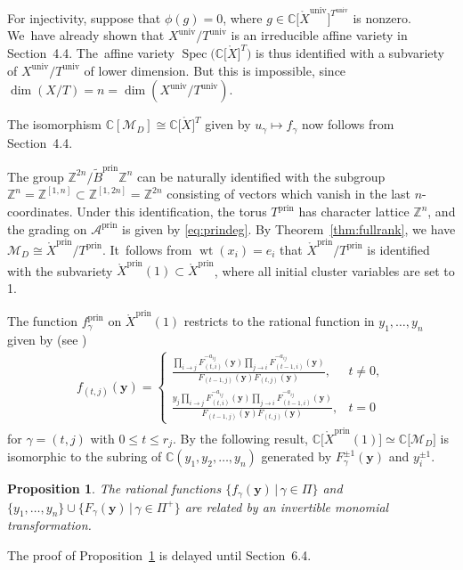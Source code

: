 \documentclass[10pt,a4paper]{amsart}
\def\C{{\mathbb C}}
\def\Z{{\mathbb Z}}
\def\A{{\mathcal{A}}}
\def\Xo{{\mathring{X}}}
\def\Spec{\operatorname{Spec}}
\def\prin{{\operatorname{prin}}}
\def\univ{{\operatorname{univ}}}
\def\tB{{\tilde B}}
\def\wt{\operatorname{wt}}
\def\M{{\mathcal{M}}}
\def\tB{{\tilde B}}
\def\y{{\mathbf y}}
\numberwithin{equation}{section}
\newtheorem{Proposition}[Theorem]{Proposition}
\begin{document}
For injectivity, suppose that $\phi(g) = 0$, where $g \in \C\big[\Xo^\univ\big]^{T^\univ}$ is nonzero. We~have already shown that $X^\univ/T^\univ$ is an irreducible affine variety in Section~4.4. The~affine variety $\Spec\big(\C\big[\Xo\big]^T\big)$ is thus identified with a subvariety of $X^\univ/T^\univ$ of lower dimension. But this is impossible, since $\dim(X/T) =n = \dim(X^\univ/T^\univ)$.

The isomorphism $\C[\M_D] \cong \C\big[\Xo\big]^T$ given by $u_\gamma \mapsto f_\gamma$ now follows from Section~4.4.

\bigskip{}
The group $\Z^{2n}/\tB^\prin \Z^n$ can be naturally identified with the subgroup $\Z^n = \Z^{[1,n]} \subset \Z^{[1,2n]}=\Z^{2n}$ consisting of vectors which vanish in the last $n$-coordinates. Under this identification, the torus $T^\prin$ has character lattice $\Z^n$, and the grading on $\A^\prin$ is given by \eqref{eq:prindeg}. By Theorem~\ref{thm:fullrank}, we have $\M_D \cong \Xo^\prin/T^\prin$. It~follows from $\wt(x_i) = e_i$ that $\Xo^\prin/T^\prin$ is identified with the subvariety $\Xo^\prin(1) \subset \Xo^\prin$, where all initial cluster variables are set to 1.

The function $f^\prin_\gamma$ on $\Xo^\prin(1)$ restricts to the rational function in $y_1,\dots,y_n$ given by (see \cite[Theorem~1.5]{YZ})
\begin{gather} \label{eq:fy}
f_{(t,j)}(\y) = \begin{cases}
\frac{\prod_{i \to j} F_{(t,i)}^{-a_{ij}}(\y) \prod_{j \to i} F_{(t-1,i)}^{-a_{ij}}(\y)}{F_{(t-1,j)}(\y) F_{(t,j)}(\y) }, &t \neq 0,
\\[1.5ex]
 \frac{y_j \prod_{i \to j} F_{(t,i)}^{-a_{ij}}(\y) \prod_{j \to i} F_{(t-1,i)}^{-a_{ij}}(\y)}{F_{(t-1,j)}(\y) F_{(t,j)}(\y) }, &t = 0
 \end{cases}
\end{gather}
for $\gamma = (t,j)$ with $0 \leq t \leq r_j$.
By the following result, $\C\big[\Xo^\prin(1)] \simeq \C[\M_D\big]$ is isomorphic to the subring of $\C(y_1,y_2,\dots,y_n)$ generated by $F_\gamma^{\pm 1}(\y)$ and $y_i^{\pm 1}$.

\begin{Proposition}\label{prop:hinvert}
The rational functions $\{f_\gamma(\y) \,|\, \gamma \in \Pi\}$ and $\{y_1,\dots,y_n\} \cup \{ F_\gamma(\y) \,|\, \gamma \in \Pi^+\}$ are related by an invertible monomial transformation.
\end{Proposition}
The proof of Proposition~\ref{prop:hinvert} is delayed until Section~6.4.
\end{document}
